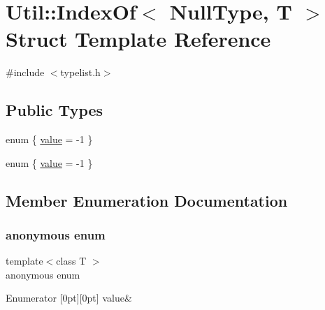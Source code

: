 \hypertarget{structUtil_1_1TL_1_1IndexOf_3_01NullType_00_01T_01_4}{}\section{Util\+:\+:Index\+Of$<$ Null\+Type, T $>$ Struct Template Reference}
\label{structUtil_1_1TL_1_1IndexOf_3_01NullType_00_01T_01_4}


{\ttfamily \#include $<$typelist.\+h$>$}

\subsection*{Public Types}
\begin{DoxyCompactItemize}
\item 
enum \{ \mbox{\hyperlink{structUtil_1_1TL_1_1IndexOf_3_01NullType_00_01T_01_4_aa7e6a49448f149e1e7dab1e44ccf5c12ab7ce1862f00c3baa377293bbd01efe32}{value}} = -\/1
 \}
\item 
enum \{ \mbox{\hyperlink{structUtil_1_1TL_1_1IndexOf_3_01NullType_00_01T_01_4_aa7e6a49448f149e1e7dab1e44ccf5c12ab7ce1862f00c3baa377293bbd01efe32}{value}} = -\/1
 \}
\end{DoxyCompactItemize}


\subsection{Member Enumeration Documentation}
\mbox{\label{structUtil_1_1TL_1_1IndexOf_3_01NullType_00_01T_01_4_ad4db28c1e8cb3a6e57608c586ed3b3b6}} 
\subsubsection{\texorpdfstring{anonymous enum}{anonymous enum}}
{\footnotesize\ttfamily template$<$class T $>$ \\
anonymous enum}

\begin{DoxyEnumFields}{Enumerator}
[0pt][0pt]{}\mbox{\label{structUtil_1_1TL_1_1IndexOf_3_01NullType_00_01T_01_4_aa7e6a49448f149e1e7dab1e44ccf5c12ab7ce1862f00c3baa377293bbd01efe32}} 
value&\\
\hline

\end{DoxyEnumFields}
\mbox{\label{structUtil_1_1TL_1_1IndexOf_3_01NullType_00_01T_01_4_aa7e6a49448f149e1e7dab1e44ccf5c12}} 
